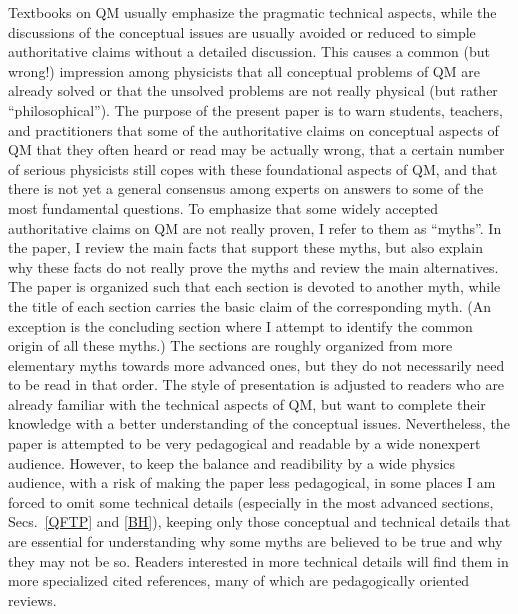\documentclass[12pt]{article}
\begin{document}
Textbooks on QM usually emphasize the pragmatic technical aspects, 
while the discussions of the conceptual issues are usually 
avoided or reduced to simple authoritative claims without a detailed 
discussion. This causes a common (but wrong!) impression among physicists 
that all conceptual problems of QM are already solved 
or that the unsolved problems are not really physical (but rather
``philosophical''). The purpose of the present paper is to 
warn students, teachers, and practitioners that some of the 
authoritative claims on conceptual aspects of QM that they often heard 
or read may be actually wrong, that a certain number of serious 
physicists still copes with these foundational aspects of QM, 
and that there is not yet a general consensus among experts on 
answers to some of the most fundamental questions.
To emphasize that some widely accepted authoritative claims on QM
are not really proven, I refer to them as ``myths''.
In the paper, I review the main facts that support
these myths, but also explain why these facts do not really prove the myths
and review the main alternatives.
The paper is organized such that each section is devoted 
to another myth, while the title of each section carries 
the basic claim of the corresponding myth. (An exception 
is the concluding section where I attempt to identify 
the common origin of all these myths.)
The sections are 
roughly organized from more elementary myths  
towards more advanced ones,
but they do not necessarily need to be read in that order. 
The style of presentation is adjusted to readers who are 
already familiar with the technical aspects of QM, but 
want to complete their knowledge with a better understanding 
of the conceptual issues. Nevertheless,
the paper is attempted to be very pedagogical and readable 
by a wide nonexpert audience. However,
to keep the balance and readibility by a wide physics audience,
with a risk of making the paper less pedagogical,
in some places I am forced to omit some technical details
(especially in the most advanced sections, Secs.~\ref{QFTP} and \ref{BH}),
keeping only those conceptual and technical details that are essential
for understanding why some myths are believed to be true and why
they may not be so. Readers interested in more technical details
will find them in more specialized cited references, many of which
are pedagogically oriented reviews.
\end{document}

